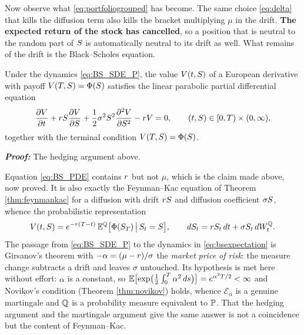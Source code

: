 Now observe what \eqref{eq:portfoliogrouped} has become. The same choice \eqref{eq:delta} that kills
the diffusion term also kills the bracket multiplying $\mu$ in the drift. \textbf{The expected return
of the stock has cancelled}, so a position that is neutral to
the random part of $S$ is automatically neutral to its drift as well. What remains of the drift is
the Black--Scholes equation.

\begin{theorem}\label{thm:blackscholespde}
Under the dynamics \eqref{eq:BS_SDE_P}, the value $V(t,S)$ of a European derivative with payoff 
$V(T,S) = \Phi(S)$ satisfies the linear parabolic partial differential equation
\begin{equation} \label{eq:BS_PDE}
    \frac{\partial V}{\partial t} + r S \frac{\partial V}{\partial S} 
    + \frac{1}{2} \sigma^2 S^2 \frac{\partial^2 V}{\partial S^2} - r V = 0, 
    \qquad (t,S)\in[0,T)\times(0,\infty),
\end{equation}
together with the terminal condition $V(T,S)=\Phi(S)$.
\end{theorem}

\textbf{\textit{Proof:}} The hedging argument above. \qedfilledtext

\medskip

Equation \eqref{eq:BS_PDE} contains $r$ but not $\mu$, which is the claim made above, now proved.
It is also exactly the Feynman--Kac equation of Theorem \ref{thm:feynmankac} for a diffusion with 
drift $r S$ and diffusion coefficient $\sigma S$, whence the probabilistic representation
\begin{equation}\label{eq:bsexpectation}
V(t,S) = e^{-r(T-t)}\,\mathbb{E}^{\mathbb{Q}}\bigl[\Phi(S_T)\,\big|\,S_t = S\bigr],
\qquad dS_t = r S_t\,dt + \sigma S_t\,dW^{\mathbb{Q}}_t .
\end{equation}
The passage from \eqref{eq:BS_SDE_P} to the dynamics in \eqref{eq:bsexpectation} is
Girsanov's theorem with $-\alpha = (\mu-r)/\sigma$ the
\emph{market price of risk}: the measure
change subtracts a drift and leaves $\sigma$ untouched. Its hypothesis is met here without effort: $\alpha$ is a constant, so
$\mathbb{E}\bigl[\exp\bigl(\tfrac12\int_0^T\alpha^2\,ds\bigr)\bigr] = e^{\alpha^2T/2} < \infty$ and
Novikov's condition (Theorem \ref{thm:novikov}) holds, whence $\mathcal{E}_\alpha$ is a genuine
martingale and $\mathbb{Q}$ is a probability measure equivalent to $\mathbb{P}$. That the hedging argument and the martingale argument give the same answer is 
not a coincidence but the content of Feynman--Kac.


